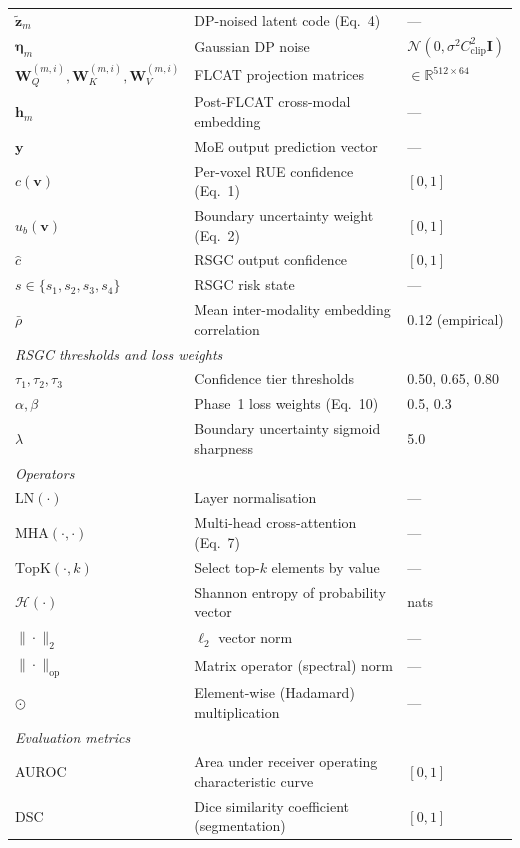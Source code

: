 \documentclass{ieeeaccess}
\begin{document}
\begin{table}[!t]
\begin{tabular}{lll}
$\tilde{\mathbf{z}}_m$ & DP-noised latent code (Eq.~4) & ---\\
$\boldsymbol{\eta}_m$ & Gaussian DP noise & $\mathcal{N}(0,\sigma^2 C_{\mathrm{clip}}^2\mathbf{I})$\\
$\mathbf{W}_Q^{(m,i)},\mathbf{W}_K^{(m,i)},\mathbf{W}_V^{(m,i)}$ & FLCAT projection matrices & $\in\mathbb{R}^{512\times 64}$\\
$\mathbf{h}_m$ & Post-FLCAT cross-modal embedding & ---\\
$\mathbf{y}$ & MoE output prediction vector & ---\\
$c(\mathbf{v})$ & Per-voxel RUE confidence (Eq.~1) & $[0,1]$\\
$u_b(\mathbf{v})$ & Boundary uncertainty weight (Eq.~2) & $[0,1]$\\
$\hat{c}$ & RSGC output confidence & $[0,1]$\\
$s \in \{s_1,s_2,s_3,s_4\}$ & RSGC risk state & ---\\
$\bar\rho$ & Mean inter-modality embedding correlation & 0.12 (empirical)\\
\midrule
\multicolumn{3}{l}{\textit{RSGC thresholds and loss weights}}\\
$\tau_1,\tau_2,\tau_3$ & Confidence tier thresholds & 0.50, 0.65, 0.80\\
$\alpha,\beta$ & Phase~1 loss weights (Eq.~10) & 0.5, 0.3\\
$\lambda$ & Boundary uncertainty sigmoid sharpness & 5.0\\
\midrule
\multicolumn{3}{l}{\textit{Operators}}\\
$\mathrm{LN}(\cdot)$ & Layer normalisation & ---\\
$\mathrm{MHA}(\cdot,\cdot)$ & Multi-head cross-attention (Eq.~7) & ---\\
$\mathrm{TopK}(\cdot,k)$ & Select top-$k$ elements by value & ---\\
$\mathcal{H}(\cdot)$ & Shannon entropy of probability vector & nats\\
$\|\cdot\|_2$ & $\ell_2$ vector norm & ---\\
$\|\cdot\|_{\mathrm{op}}$ & Matrix operator (spectral) norm & ---\\
$\odot$ & Element-wise (Hadamard) multiplication & ---\\
\midrule
\multicolumn{3}{l}{\textit{Evaluation metrics}}\\
AUROC & Area under receiver operating characteristic curve & $[0,1]$\\
DSC & Dice similarity coefficient (segmentation) & $[0,1]$\\

\end{tabular}
\end{table}
\end{document}
